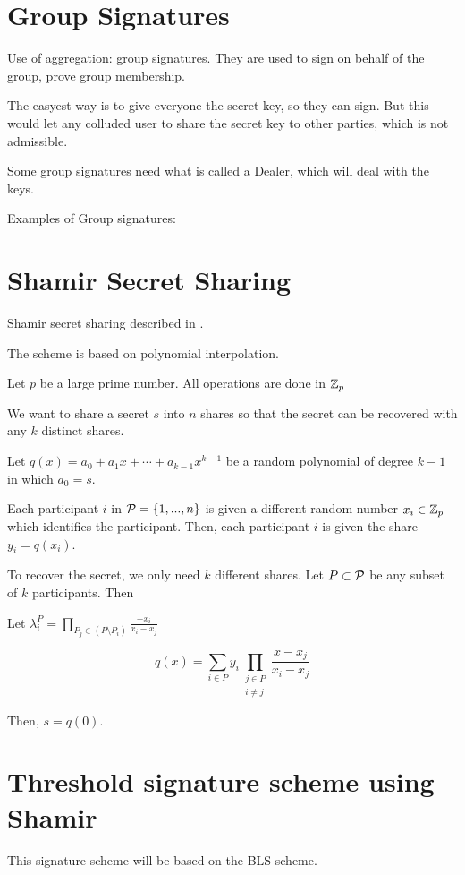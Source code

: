 \newpage
\section{Group Signatures}
Use of aggregation: group signatures. They are used to sign on behalf of the group, prove group membership.

The easyest way is to give everyone the secret key, so they can sign. But this would let any colluded user to share the secret key to other parties, which is not admissible.

Some group signatures need what is called a Dealer, which will deal with the keys.

Examples of Group signatures:

\section{Shamir Secret Sharing}
Shamir secret sharing described in \cite{Sham79}.

The scheme is based on polynomial interpolation.

Let $p$ be a large prime number. All operations are done in ${\mathbb Z}_p$

We want to share a secret $s$ into $n$ shares so that the secret can be recovered with any $k$ distinct shares.

Let $q(x) = a_0 + a_1 x + \cdots + a_{k-1} x^{k-1}$ be a random polynomial of degree $k-1$ in which $a_0 = s$.

Each participant $i$ in ${\mathcal P} = \{ 1, ... , n \}$ is given a different random number $x_i \in {\mathbb Z}_p$ which identifies the participant.
Then, each participant $i$ is given the share $y_i = q(x_i)$.

To recover the secret, we only need $k$ different shares. Let $P \subset {\mathcal P}$ be any subset of $k$ participants. Then

Let $\lambda_i^{P} = \prod_{P_j \in (P \setminus P_i)} \frac{-x_i}{x_i - x_j}$

$$
    q(x) = \sum_{i \in P} y_i \prod_{\substack{j \in P \\ i \neq j}} \frac{x-x_j}{x_i-x_j}
$$

Then, $s = q(0)$.

\section{Threshold signature scheme using Shamir}

This signature scheme will be based on the BLS scheme.

